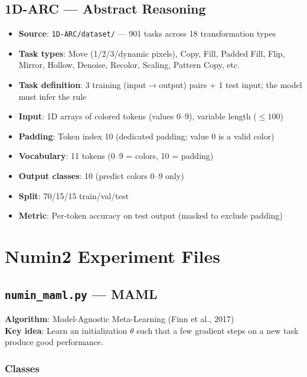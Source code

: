 \documentclass[11pt,a4paper]{article}
\begin{document}
\subsection{1D-ARC --- Abstract Reasoning}
\begin{itemize}[nosep]
  \item \textbf{Source}: \texttt{1D-ARC/dataset/} --- 901 tasks across 18 transformation types
  \item \textbf{Task types}: Move (1/2/3/dynamic pixels), Copy, Fill, Padded Fill, Flip, Mirror, Hollow, Denoise, Recolor, Scaling, Pattern Copy, etc.
  \item \textbf{Task definition}: 3 training (input$\to$output) pairs + 1 test input; the model must infer the rule
  \item \textbf{Input}: 1D arrays of colored tokens (values 0--9), variable length ($\leq 100$)
  \item \textbf{Padding}: Token index 10 (dedicated padding; value 0 is a valid color)
  \item \textbf{Vocabulary}: 11 tokens (0--9 = colors, 10 = padding)
  \item \textbf{Output classes}: 10 (predict colors 0--9 only)
  \item \textbf{Split}: 70/15/15 train/val/test
  \item \textbf{Metric}: Per-token accuracy on test output (masked to exclude padding)
\end{itemize}

\section{Numin2 Experiment Files}

\subsection{\texttt{numin\_maml.py} --- MAML}
\textbf{Algorithm}: Model-Agnostic Meta-Learning (Finn et al., 2017)\\
\textbf{Key idea}: Learn an initialization $\theta$ such that a few gradient steps on a new task produce good performance.

\subsubsection{Classes}
\end{document}

